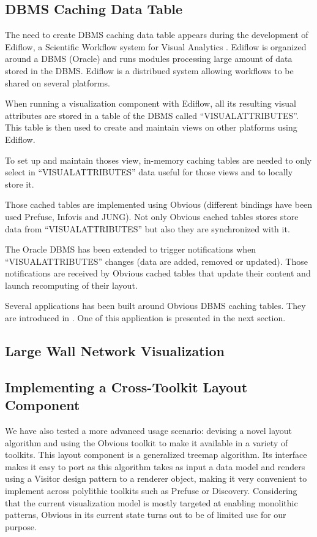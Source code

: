 \subsection{DBMS Caching Data Table}

The need to create DBMS caching data table appears during the development
of Ediflow, a Scientific Workflow system for Visual Analytics \cite{Ediflow}.
Ediflow is organized around a DBMS (Oracle) and runs modules processing
large amount of data stored in the DBMS. Ediflow is a distribued system
allowing workflows to be shared on several platforms.

When running a visualization component with Ediflow, all its resulting
visual attributes are stored in a table of the DBMS called
``VISUALATTRIBUTES''. This table is then used to create and maintain
views on other platforms using Ediflow.

To set up and maintain thoses view, in-memory caching tables are needed
to only select in ``VISUALATTRIBUTES''  data useful for those views
and to locally store it.

Those cached tables are implemented using Obvious (different bindings
have been used Prefuse, Infovis and JUNG). Not only Obvious cached
tables stores store data from ``VISUALATTRIBUTES'' but also they are
synchronized with it.

The Oracle DBMS has been extended to trigger notifications when
``VISUALATTRIBUTES'' changes (data are added, removed or updated). Those
notifications are received by Obvious cached tables that update their
content and launch recomputing of their layout.

Several applications has been built around Obvious DBMS caching
tables. They are introduced in \cite{Ediflow}. One of this application
is presented in the next section.

\subsection{Large Wall Network Visualization}


\subsection{Implementing a Cross-Toolkit Layout Component}

We have also tested a more advanced usage scenario: devising
a novel layout algorithm and using the Obvious toolkit to make it
available in a variety of toolkits. This layout component is a
generalized treemap algorithm.
Its interface makes it easy to port as this
algorithm takes as input a data model and renders using a Visitor
design pattern to a renderer object, making it very convenient to
implement across polylithic toolkits such as Prefuse or Discovery.
Considering that the current visualization model is mostly targeted at
enabling monolithic patterns, Obvious in its current state turns out
to be of limited use for our purpose.


